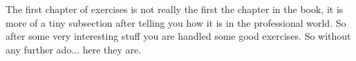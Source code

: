 
The first chapter of exercises is not really the first the chapter in the book, it is more of a tiny subsection after telling you how it is in the professional world. So after some very interesting stuff you are handled some good exercises. So without any further ado... here they are. 

\label{ssec:Exercises}


\pagebreak

\pagebreak

\pagebreak

\pagebreak

\pagebreak

\pagebreak

\pagebreak
